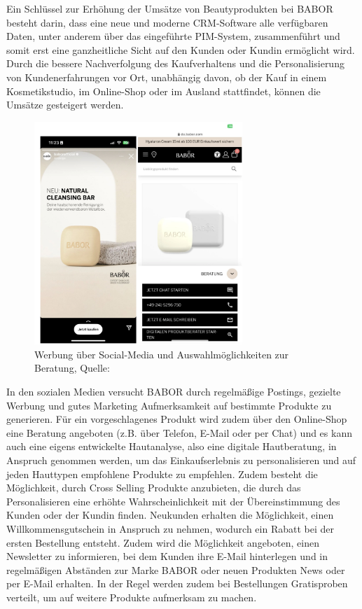 Ein Schlüssel zur Erhöhung der Umsätze von Beautyprodukten bei BABOR besteht darin, dass eine neue und moderne CRM-Software alle verfügbaren Daten, unter anderem über das eingeführte PIM-System, zusammenführt und somit erst eine ganzheitliche Sicht auf den Kunden oder Kundin ermöglicht wird. Durch die bessere Nachverfolgung des Kaufverhaltens und die Personalisierung von Kundenerfahrungen vor Ort, unabhängig davon, ob der Kauf in einem Kosmetikstudio, im Online-Shop oder im Ausland stattfindet, können die Umsätze  gesteigert werden.

\begin{figure}[!ht]
	\centering
	\includegraphics[width=0.7\textwidth]{src/abbildungen/babor_ad.png}
	\caption[Quelle: BABOR Webseite und Instagram AD]{Werbung über Social-Media und Auswahlmöglichkeiten zur Beratung, Quelle: ~\autocite[S.14]{babor2023}}
       \label{fig:Beschreibung}
\end{figure}

In den sozialen Medien versucht BABOR durch regelmäßige Postings, gezielte Werbung und gutes Marketing Aufmerksamkeit auf bestimmte Produkte zu generieren.
\newline
Für ein vorgeschlagenes Produkt wird zudem über den Online-Shop eine Beratung angeboten (z.B. über Telefon, E-Mail oder per Chat) und es kann auch eine eigens entwickelte Hautanalyse, also eine digitale Hautberatung, in Anspruch genommen werden, um das Einkaufserlebnis zu personalisieren und auf jeden Hauttypen empfohlene Produkte zu empfehlen. Zudem besteht die Möglichkeit, durch Cross Selling Produkte anzubieten, die durch das Personalisieren eine erhöhte Wahrscheinlichkeit mit der Übereinstimmung des Kunden oder der Kundin finden. Neukunden erhalten die Möglichkeit, einen Willkommensgutschein in Anspruch zu nehmen, wodurch ein Rabatt bei der ersten Bestellung entsteht. Zudem wird die Möglichkeit angeboten, einen Newsletter zu informieren, bei dem Kunden ihre E-Mail hinterlegen und in regelmäßigen Abständen zur Marke BABOR oder neuen Produkten News oder per E-Mail erhalten.
In der Regel werden zudem bei Bestellungen Gratisproben verteilt, um auf weitere Produkte aufmerksam zu machen.
\newline

